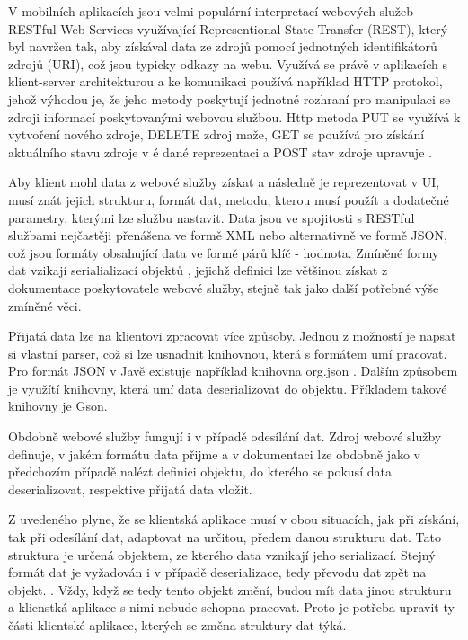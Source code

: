 V mobilních aplikacích jsou velmi populární interpretací webových služeb RESTful Web Services využívající Representional State Transfer (REST), který byl navržen tak, aby získával data ze zdrojů pomocí jednotných identifikátorů zdrojů (URI), což jsou typicky odkazy na webu. Využívá se právě v aplikacích s klient-server architekturou a ke komunikaci používá například HTTP protokol, jehož výhodou je, že jeho metody poskytují jednotné rozhraní pro manipulaci se zdroji informací poskytovanými webovou službou. Http metoda PUT se využívá k vytvoření nového zdroje, DELETE zdroj maže, GET se používá pro získání aktuálního stavu zdroje v 
é dané reprezentaci a POST stav zdroje upravuje \cite{oracle-ws}. 

Aby klient mohl data z webové služby získat a následně je reprezentovat v UI, musí znát jejich strukturu, formát dat, metodu, kterou musí použít a dodatečné parametry, kterými lze službu nastavit. Data jsou ve spojitosti s RESTful službami nejčastěji přenášena ve formě XML nebo alternativně ve formě JSON\cite{ws-formats}, což jsou formáty obsahující data ve formě párů klíč - hodnota. Zmíněné formy dat vzikají serialializací objektů \cite{serialization}, jejichž definici lze většinou získat z dokumentace poskytovatele webové služby, stejně tak jako další potřebné výše zmíněné věci.

Přijatá data lze na klientovi zpracovat více způsoby. Jednou z možností je napsat si vlastní parser, což si lze usnadnit knihovnou, která s formátem umí pracovat. Pro formát JSON v Javě existuje například knihovna org.json \cite{json}. Dalším způsobem je využítí knihovny, která umí data deserializovat do objektu. Příkladem takové knihovny je Gson\cite{gson}. 

Obdobně webové služby fungují i v případě odesílání dat. Zdroj webové služby definuje, v jakém formátu data přijme a v dokumentaci lze obdobně jako v předchozím případě nalézt definici objektu, do kterého se pokusí data deserializovat, respektive přijatá data vložit. 

Z uvedeného plyne, že se klientská aplikace musí v obou situacích, jak při získání, tak při odesílání dat, adaptovat na určitou, předem danou strukturu dat. Tato struktura je určená objektem, ze kterého data vznikají jeho serializací. Stejný formát dat je vyžadován i v případě deserializace, tedy převodu dat zpět na objekt. \cite{serialization}. Vždy, když se tedy tento objekt změní, budou mít data jinou strukturu a klienstká aplikace s nimi nebude schopna pracovat. Proto je potřeba upravit ty části klientské aplikace, kterých se změna struktury dat týká.

